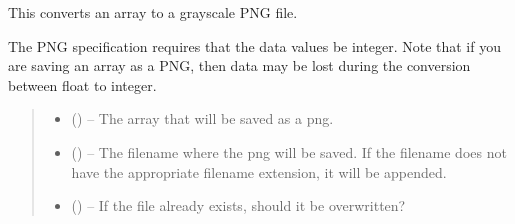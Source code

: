 \documentclass[letterpaper,11pt,english]{sphinxmanual}
\begin{document}
\begin{savenotes}\begin{fulllineitems}
\label{\detokenize{code/opihiexarata.library.image:opihiexarata.library.image.save_array_as_png_grayscale}}
\pysigstartsignatures
{}
\pysigstopsignatures
\sphinxAtStartPar
This converts an array to a grayscale PNG file.

\sphinxAtStartPar
The PNG specification requires that the data values be integer. Note that
if you are saving an array as a PNG, then data may be lost during the
conversion between float to integer.
\begin{quote}\begin{description}
\begin{itemize}
\item {} 
\sphinxAtStartPar
{} () – The array that will be saved as a png.

\item {} 
\sphinxAtStartPar
{} () – The filename where the png will be saved. If the filename does not have
the appropriate filename extension, it will be appended.

\item {} 
\sphinxAtStartPar
{} () – If the file already exists, should it be overwritten?

\end{itemize}

\end{description}\end{quote}

\end{fulllineitems}\end{savenotes}
\end{document}
